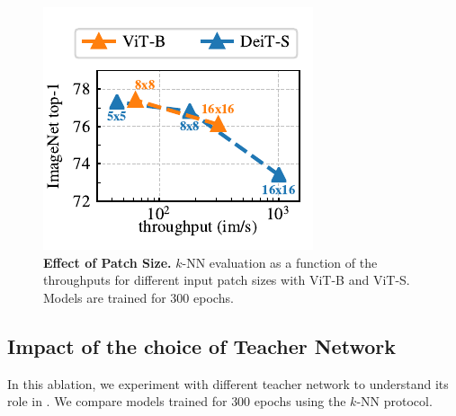 \begin{figure}[t]
  \begin{minipage}{0.6\linewidth}
	\centering
  \includegraphics[width=\linewidth]{figure_throughput_knn_our.pdf}
\end{minipage}
  \begin{minipage}{0.35\linewidth}
	\caption{
    \textbf{Effect of Patch Size.}
     $k$-NN evaluation as a function of the throughputs for different input patch sizes with ViT-B and ViT-S. Models are trained for 300 epochs.
}
  \label{fig:patch-size}
\end{minipage}
\end{figure}


\subsection{Impact of the choice of Teacher Network}
\label{sec:teacher}
In this ablation, we experiment with different teacher network to understand its role in \OURS. 
We compare models trained for $300$ epochs using the $k$-NN protocol.

